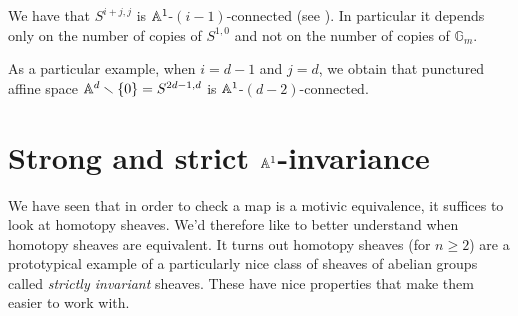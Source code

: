 \documentclass[11pt,openany]{book}
\begin{document}
\begin{example}\label{exa:connectivity-motivic-spheres} 
We have that $S^{i+j,j}$ is $\mathbb{A}^1$-$(i-1)$-connected (see \cite[2.4.5]{AO-contractible}). In particular it depends only on the number of copies of $S^{1,0}$ and not on the number of copies of $\mathbb{G}_m$.
\end{example}

\begin{example}\label{exa:connectivity-punctured-affine-space}
As a particular example, when $i=d-1$ and $j=d$, we obtain that punctured affine space $\mathbb{A}^d\smallsetminus\{0\} = S^{2d-1,d}$ is $\mathbb{A}^1$-$(d-2)$-connected. 
\end{example}









\section{Strong and strict \texorpdfstring{$\mathbb{A}^1$}{A\^{}1}-invariance}

\begin{goal} 
We have seen that in order to check a map is a motivic equivalence, it suffices to look at homotopy sheaves. We'd therefore like to better understand when homotopy sheaves are equivalent. It turns out homotopy sheaves (for $n\ge 2$) are a prototypical example of a particularly nice class of sheaves of abelian groups called \textit{strictly invariant} sheaves. These have nice properties that make them easier to work with.
\end{goal}
\end{document}

